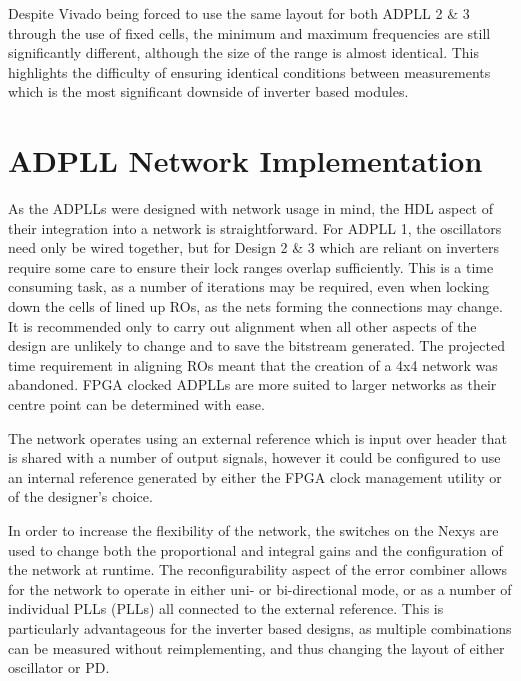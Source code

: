 Despite Vivado being forced to use the same layout for both \ac{ADPLL} 2 \& 3 through the use of fixed cells, the minimum and maximum frequencies are still significantly different, although the size of the range is almost identical. This highlights the difficulty of ensuring identical conditions between measurements which is the most significant downside of inverter based modules. 


\section{\acs{ADPLL} Network Implementation}
As the \acp{ADPLL} were designed with network usage in mind, the \ac{HDL} aspect of their integration into a network is straightforward. For \ac{ADPLL} 1, the oscillators need only be wired together, but for Design 2 \& 3 which are reliant on inverters require some care to ensure their lock ranges overlap sufficiently. This is a time consuming task, as a number of iterations may be required, even when locking down the cells of lined up \acp{RO}, as the nets forming the connections may change. It is recommended only to carry out alignment when all other aspects of the design are unlikely to change and to save the bitstream generated. The projected time requirement in aligning \acp{RO} meant that the creation of a 4x4 network was abandoned. \ac{FPGA} clocked \acp{ADPLL} are more suited to larger networks as their centre point can be determined with ease.

The network operates using an external reference which is input over  header that is shared with a number of output signals, however it could be configured to use an internal reference generated by either the \ac{FPGA} clock management utility or  of the designer's choice. 

In order to increase the flexibility of the network, the switches on the \acs*{Nexys} are used to change both the proportional and integral gains and the configuration of the network at runtime. The reconfigurability aspect of the error combiner allows for the network to operate in either uni- or bi-directional mode, or as a number of individual \aclp{PLL} (\acsp{PLL}) all connected to the external reference. This is particularly advantageous for the inverter based designs, as multiple combinations can be measured without reimplementing, and thus changing the layout of either oscillator or \acl{PD}.

